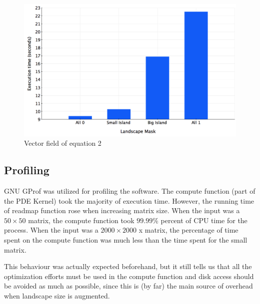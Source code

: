 \documentclass[12pt,a4paper]{article}
\begin{document}
\begin{figure}[hb]
    \centering
    \includegraphics[scale=0.3]{images/bargraph.png}
    \caption{Vector field of equation 2}
\end{figure}


\subsection{Profiling}

GNU GProf was utilized for profiling the software. The compute function (part of the PDE Kernel) took the majority of execution time. However, the running time of readmap function rose when increasing matrix size. When the input was a $50\times 50$ matrix, the compute function took $99.99\%$ percent of CPU time for the process. When the input was a $2000\times 2000$ x matrix, the percentage of time spent on the compute function was much less than the time spent for the small matrix. 

This behaviour was actually expected beforehand, but it still tells us that all the optimization efforts must be used in the compute function and disk access should be avoided as much as possible, since this is (by far) the main source of overhead when landscape size is augmented.
\end{document}
